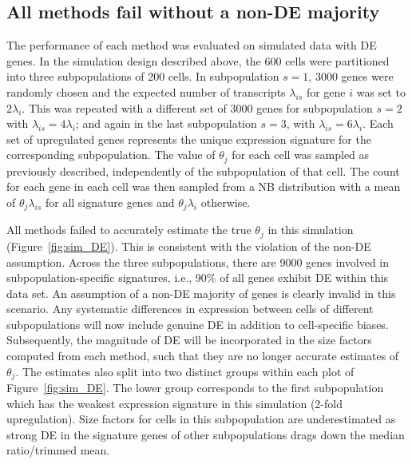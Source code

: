 \documentclass{article}
\begin{document}
\subsection{All methods fail without a non-DE majority}
The performance of each method was evaluated on simulated data with DE genes.
In the simulation design described above, the 600 cells were partitioned into three subpopulations of 200 cells.
In subpopulation $s=1$, 3000 genes were randomly chosen and the expected number of transcripts $\lambda_{is}$ for gene $i$ was set to $2\lambda_{i}$.
This was repeated with a different set of 3000 genes for subpopulation $s=2$ with $\lambda_{is}=4\lambda_i$; and again in the last subpopulation $s=3$, with $\lambda_{is}=6\lambda_i$.
Each set of upregulated genes represents the unique expression signature for the corresponding subpopulation.
The value of $\theta_j$ for each cell was sampled as previously described, independently of the subpopulation of that cell.
The count for each gene in each cell was then sampled from a NB distribution with a mean of $\theta_j\lambda_{is}$ for all signature genes and $\theta_j\lambda_i$ otherwise.


All methods failed to accurately estimate the true $\theta_j$ in this simulation (Figure~\ref{fig:sim_DE}).
This is consistent with the violation of the non-DE assumption.
Across the three subpopulations, there are 9000 genes involved in subpopulation-specific signatures, i.e., 90\% of all genes exhibit DE within this data set.
An assumption of a non-DE majority of genes is clearly invalid in this scenario.
Any systematic differences in expression between cells of different subpopulations will now include genuine DE in addition to cell-specific biases.
Subsequently, the magnitude of DE will be incorporated in the size factors computed from each method, such that they are no longer accurate estimates of $\theta_j$.
The estimates also split into two distinct groups within each plot of Figure~\ref{fig:sim_DE}.
The lower group corresponds to the first subpopulation which has the weakest expression signature in this simulation (2-fold upregulation).
Size factors for cells in this subpopulation are underestimated as strong DE in the signature genes of other subpopulations drags down the median ratio/trimmed mean.
\end{document}
